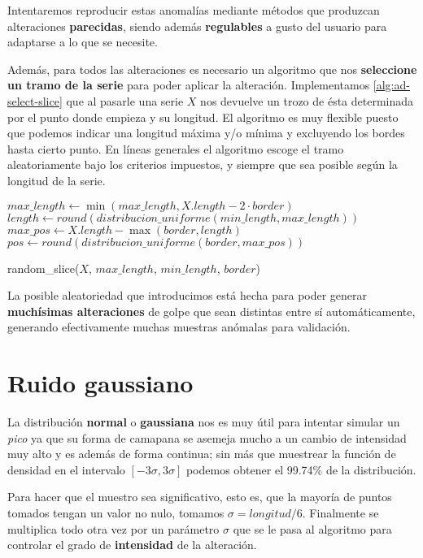 Intentaremos reproducir estas anomalías mediante métodos que produzcan alteraciones \textbf{parecidas}, siendo además \textbf{regulables} a gusto del usuario para adaptarse a lo que se necesite.

Además, para todos las alteraciones es necesario un algoritmo que nos \textbf{seleccione un tramo de la serie} para poder aplicar la alteración. Implementamos \autoref{alg:ad-select-slice} que al pasarle una serie $X$ nos devuelve un trozo de ésta determinada por el punto donde empieza y su longitud. El algoritmo es muy flexible puesto que podemos indicar una longitud máxima y/o mínima y excluyendo los bordes hasta cierto punto. En líneas generales el algoritmo escoge el tramo aleatoriamente bajo los criterios impuestos, y siempre que sea posible según la longitud de la serie.

\begin{algorithm}[htbp]
\SetAlgoLined
  $max\_length \gets \min(max\_length, X.length - 2 \cdot border)$\;
  $length \gets round(distribucion\_uniforme(min\_length, max\_length))$\;
  $max\_pos \gets X.length - \max(border, length)$\;
  $pos \gets round(distribucion\_uniforme(border, max\_pos))$\;
 \caption{random\_slice($X$, $max\_length$, $min\_length$, $border$)}
 \label{alg:ad-select-slice}
\end{algorithm}

La posible aleatoriedad que introducimos está hecha para poder generar \textbf{muchísimas alteraciones} de golpe que sean distintas entre sí automáticamente, generando efectivamente muchas muestras anómalas para validación.

\section{Ruido gaussiano}

La distribución \textbf{normal} o \textbf{gaussiana} nos es muy útil para intentar simular un \emph{pico} ya que su forma de camapana se asemeja mucho a un cambio de intensidad muy alto y es además de forma continua; sin más que muestrear la función de densidad en el intervalo $[-3 \sigma, 3 \sigma]$ podemos obtener el 99.74\% de la distribución.

Para hacer que el muestro sea significativo, esto es, que la mayoría de puntos tomados tengan un valor no nulo, tomamos $\sigma = longitud / 6$. Finalmente se multiplica todo otra vez por un parámetro $\sigma$ que se le pasa al algoritmo para controlar el grado de \textbf{intensidad} de la alteración.

